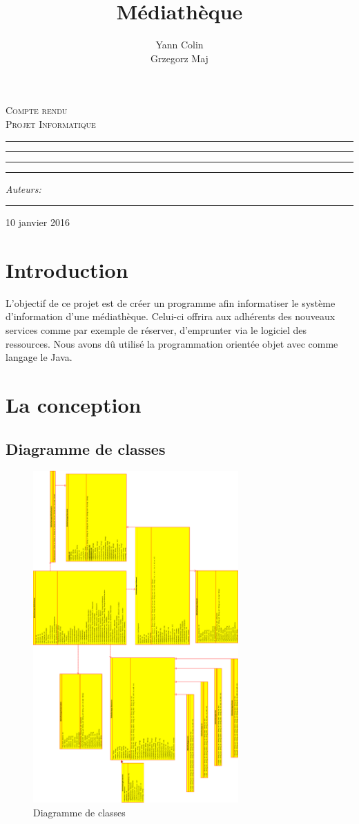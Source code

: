 \documentclass[10pt, a4paper]{article}
\author{Yann Colin \\Grzegorz Maj}
\title{Médiathèque}
\makeatletter
\newcommand{\linia}{\rule{\linewidth}{0.4mm}}
\def\maketitle{%
\begin{titlepage}
	\begin{center}
		\LARGE
		\textsc{Compte rendu \\ Projet Informatique}
	\end{center}

	\vspace{3cm}

	\begin{center}\leavevmode
      \hrule
    \vskip 1pt
	\linia
	\vskip 0.5cm
	\Huge \textsc{\@title}\par

	\vskip 0.5cm
      	\linia
      \vskip 1pt
      \hrule

	\vskip 2mm

	\vspace{1.5cm}
	\begin{flushright}
		\begin{minipage}{5cm}
			\textit{\normalsize Auteurs:}\\
			\Large \textit{\@author} \par
			\vskip 2pt
			\hrule
			
		\end{minipage}
	\end{flushright}
    

	\end{center}%
	\vspace*{\stretch{6}}
    \begin{center}
    10 janvier 2016
    \end{center}
\end{titlepage}
	}
\makeatother
\begin{document}

    \maketitle
    
    \tableofcontents
    \newpage
    
    \section{Introduction}
    
    L'objectif de ce projet est de créer un programme afin informatiser le système d'information d'une
    médiathèque. Celui-ci offrira aux adhérents des nouveaux services comme par exemple de réserver,
    d'emprunter via le logiciel des ressources. Nous avons dû utilisé la programmation orientée objet avec comme langage 
    le Java.
    
     
    
     \section{La conception}
     
	     \subsection{Diagramme de classes}
		\begin{figure}[ht]
	    \centering
	    		\includegraphics[width=0.7\textwidth]{graphics/class90.eps}
	    		\caption{Diagramme de classes}
	    		\label{fig:label}
	    	\end{figure}
	    	\newpage
     
\end{document}
